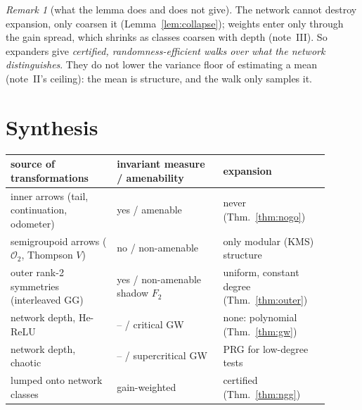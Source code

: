\documentclass[11pt]{article}
\theoremstyle{definition}
\theoremstyle{remark}
\newtheorem{remark}[theorem]{Remark}
\begin{document}
\begin{remark}[what the lemma does and does not give]
The network cannot destroy expansion, only coarsen it (Lemma~\ref{lem:collapse}); weights enter only through the gain spread, which shrinks as classes coarsen with depth (note~III). So expanders give \emph{certified, randomness-efficient walks over what the network distinguishes}. They do not lower the variance floor of estimating a mean (note~II's ceiling): the mean is structure, and the walk only samples it.
\end{remark}

\section{Synthesis}
\begin{center}\small
\begin{tabular}{p{0.3\linewidth}p{0.3\linewidth}p{0.3\linewidth}}
\toprule
source of transformations & invariant measure / amenability & expansion\\
\midrule
inner arrows (tail, continuation, odometer) & yes / amenable & never (Thm.~\ref{thm:nogo})\\
semigroupoid arrows ($\mathcal O_2$, Thompson $V$) & no / non-amenable & only modular (KMS) structure\\
outer rank-2 symmetries (interleaved GG) & yes / non-amenable shadow $F_2$ & uniform, constant degree (Thm.~\ref{thm:outer})\\
network depth, He-ReLU & -- / critical GW & none: polynomial (Thm.~\ref{thm:gw})\\
network depth, chaotic & -- / supercritical GW & PRG for low-degree tests\\
lumped onto network classes & gain-weighted & certified (Thm.~\ref{thm:ngg})\\
\bottomrule
\end{tabular}
\end{center}
\end{document}

